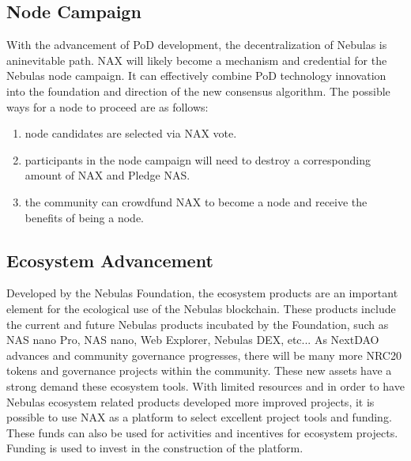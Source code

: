 \subsection{Node Campaign}
With the advancement of PoD development, the decentralization of Nebulas is aninevitable path. NAX will likely become a mechanism and credential for the Nebulas node campaign. It can effectively combine PoD technology innovation into the foundation and direction of the new consensus algorithm. The possible ways for a node to proceed are as follows:
\begin{enumerate}[\hspace{1cm}(a)]
	\item node candidates are selected via NAX vote.
	\item participants in the node campaign will need to destroy a corresponding amount of NAX and Pledge NAS.
	\item the community can crowdfund NAX to become a node and receive the benefits of being a node.
\end{enumerate}

\subsection{Ecosystem Advancement}
Developed by the Nebulas Foundation, the ecosystem products are an important element for the ecological use of the Nebulas blockchain. These products include the current and future Nebulas products incubated by the Foundation, such as NAS nano Pro, NAS nano, Web Explorer, Nebulas DEX, etc... As NextDAO advances and community governance progresses, there will be many more NRC20 tokens and governance projects within the community. These new assets have a strong demand these ecosystem tools. With limited resources and in order to have Nebulas ecosystem related products developed more improved projects, it is possible to use NAX as a platform to select excellent project tools and funding. These funds can also be used for activities and incentives for ecosystem projects. Funding is used to invest in the construction of the platform.
